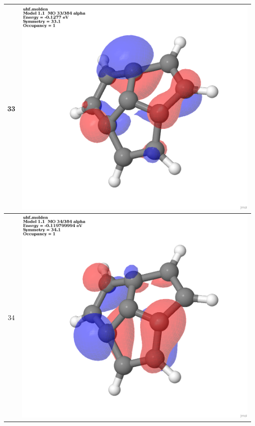 \documentclass{article}
\begin{document}
\begin{tabular}{|c|c|}
33 & \includegraphics[scale=0.1]{M1T_33.png}\\ \hline
34 & \includegraphics[scale=0.1]{M1T_34.png}\\ \hline

\end{tabular}
\end{document}
